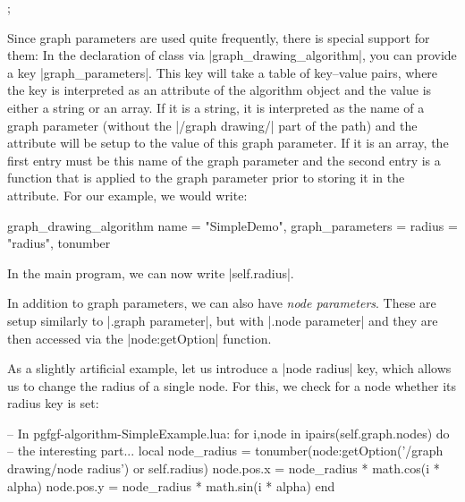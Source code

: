 \begin{codeexample}[]
\tikz {};
\end{codeexample}

Since graph parameters are used quite frequently, there is special
support for them: In the declaration of class via
|graph_drawing_algorithm|, you can provide a key
|graph_parameters|. This key will take a table of key--value pairs,
where the key is interpreted as an attribute of the algorithm object
and the value is either a string or an array. If it is a string, it is
interpreted as the name of a graph parameter (without the
|/graph drawing/| part of the path) and the attribute will be setup to
the value of this graph parameter. If it is an array, the first entry
must be this name of the graph parameter and the second entry is a
function that is applied to the graph parameter prior to storing it in
the attribute. For our example, we would write:

\begin{codeexample}
graph_drawing_algorithm {
  name = "SimpleDemo",
  graph_parameters = {
    radius = { "radius", tonumber }
  }
}
\end{codeexample}
In the main program, we can now write |self.radius|.

In addition to graph parameters, we can also have \emph{node
  parameters}. These are setup similarly to |.graph parameter|, but
with |.node parameter| and they are then accessed via the
|node:getOption| function.

As a slightly artificial example, let us introduce a |node radius|
key, which allows us to change the radius of a single node. For this,
we check for a node whether its radius key is set:

\begin{codeexample}
-- In pgfgf-algorithm-SimpleExample.lua:
   for i,node in ipairs(self.graph.nodes) do
      -- the interesting part...
      local node_radius = tonumber(node:getOption('/graph drawing/node radius')
                                   or self.radius)
      node.pos.x = node_radius * math.cos(i * alpha)
      node.pos.y = node_radius * math.sin(i * alpha)
   end
   
\end{codeexample}


